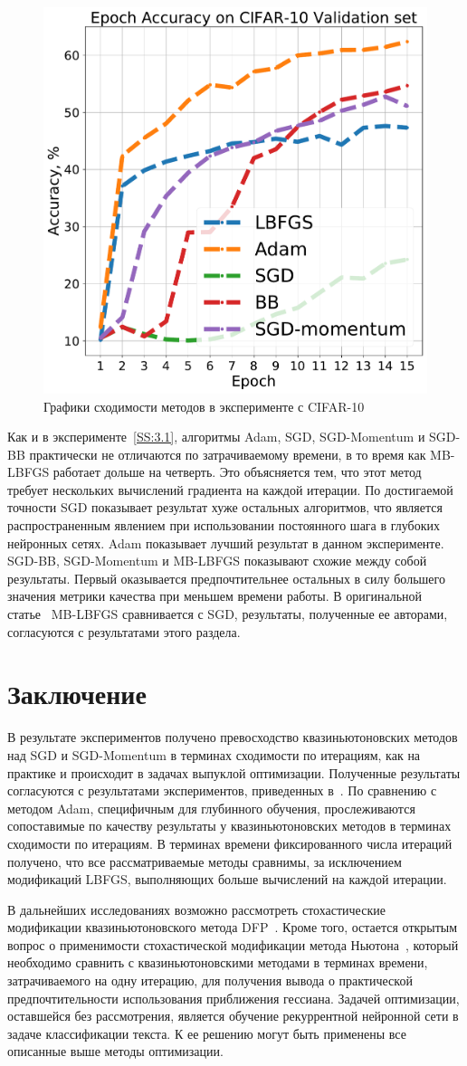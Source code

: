 \documentclass[preprint,12pt]{elsarticle}
\begin{document}
{\begin{figure}[ht!]
    \includegraphics[height=.33\textwidth]{cifar_val_accuracy.pdf}
\caption{Графики сходимости методов в эксперименте с CIFAR-10}
\end{figure}

Как и в эксперименте~\ref{SS:3.1}, алгоритмы Adam, SGD, SGD-Momentum и SGD-BB практически не отличаются по затрачиваемому времени, в то время как MB-LBFGS работает дольше на четверть. 
Это объясняется тем, что этот метод требует нескольких вычислений градиента на каждой итерации. 
По достигаемой точности SGD показывает результат хуже остальных алгоритмов, что является распространенным явлением при использовании постоянного шага в глубоких нейронных сетях. 
Adam показывает лучший результат в данном эксперименте.
SGD-BB, SGD-Momentum и MB-LBFGS показывают схожие между собой результаты. Первый оказывается предпочтительнее остальных в силу большего значения метрики качества при меньшем времени работы.
В оригинальной статье~\cite{multibatchLBFGS} MB-LBFGS сравнивается с SGD, результаты, полученные ее авторами, согласуются с результатами этого раздела.

\section{Заключение}
\label{S:4}
В результате экспериментов получено превосходство квазиньютоновских методов над SGD и SGD-Momentum в терминах сходимости по итерациям, как на практике и происходит в задачах выпуклой оптимизации. Полученные результаты согласуются с результатами экспериментов, приведенных в~\cite{multibatchLBFGS, BB-DL}.
По сравнению с методом Adam, специфичным для глубинного обучения, прослеживаются сопоставимые по качеству результаты у квазиньютоновских методов в терминах сходимости по итерациям.
В терминах времени фиксированного числа итераций получено, что все рассматриваемые методы сравнимы, за исключением модификаций LBFGS, выполняющих больше вычислений на каждой итерации.

В дальнейших исследованиях возможно рассмотреть стохастические модификации квазиньютоновского метода DFP~\cite{DFPorig}.
Кроме того, остается открытым вопрос о применимости стохастической модификации метода Ньютона~\cite{numopt}, который необходимо сравнить с квазиньютоновскими методами в терминах времени, затрачиваемого на одну итерацию, для получения вывода о практической предпочтительности использования приближения гессиана. 
Задачей оптимизации, оставшейся без рассмотрения, является обучение рекуррентной нейронной сети в задаче классификации текста.
К ее решению могут быть применены все описанные выше методы оптимизации.

}
\end{document}
